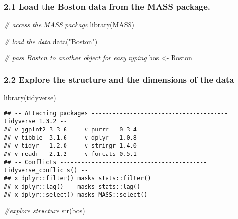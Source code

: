 \documentclass[
]{article}
\newenvironment{Shaded}{\begin{snugshade}}{\end{snugshade}}
\newcommand{\CommentTok}[1]{\textcolor[rgb]{0.56,0.35,0.01}{\textit{#1}}}
\newcommand{\FunctionTok}[1]{\textcolor[rgb]{0.00,0.00,0.00}{#1}}
\newcommand{\NormalTok}[1]{#1}
\newcommand{\OtherTok}[1]{\textcolor[rgb]{0.56,0.35,0.01}{#1}}
\newcommand{\StringTok}[1]{\textcolor[rgb]{0.31,0.60,0.02}{#1}}
\begin{document}
\hypertarget{load-the-boston-data-from-the-mass-package.}{%
\subsubsection{2.1 Load the Boston data from the MASS
package.}\label{load-the-boston-data-from-the-mass-package.}}

\begin{Shaded}
\begin{Highlighting}[]
\CommentTok{\# access the MASS package}
\FunctionTok{library}\NormalTok{(MASS)}

\CommentTok{\# load the data}
\FunctionTok{data}\NormalTok{(}\StringTok{"Boston"}\NormalTok{)}

\CommentTok{\# pass Boston to another object for easy typing}
\NormalTok{bos }\OtherTok{\textless{}{-}}\NormalTok{ Boston}
\end{Highlighting}
\end{Shaded}

\hypertarget{explore-the-structure-and-the-dimensions-of-the-data}{%
\subsubsection{2.2 Explore the structure and the dimensions of the
data}\label{explore-the-structure-and-the-dimensions-of-the-data}}

\begin{Shaded}
\begin{Highlighting}[]
\FunctionTok{library}\NormalTok{(tidyverse)}
\end{Highlighting}
\end{Shaded}

\begin{verbatim}
## -- Attaching packages --------------------------------------- tidyverse 1.3.2 --
## v ggplot2 3.3.6     v purrr   0.3.4
## v tibble  3.1.6     v dplyr   1.0.8
## v tidyr   1.2.0     v stringr 1.4.0
## v readr   2.1.2     v forcats 0.5.1
## -- Conflicts ------------------------------------------ tidyverse_conflicts() --
## x dplyr::filter() masks stats::filter()
## x dplyr::lag()    masks stats::lag()
## x dplyr::select() masks MASS::select()
\end{verbatim}

\begin{Shaded}
\begin{Highlighting}[]
\CommentTok{\#explore structure}
\FunctionTok{str}\NormalTok{(bos)}
\end{Highlighting}
\end{Shaded}
\end{document}
